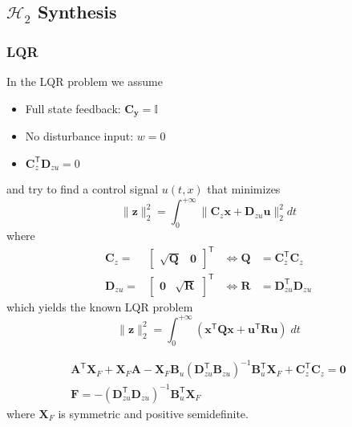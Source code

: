 \subsection{\texorpdfstring{$\mathcal{H}_2$}{H2} Synthesis}
\subsubsection{LQR}
In the LQR problem we assume
\begin{itemize}
    \item Full state feedback: $\mathbf{C_y}=\mathbf{\mathbb{I}}$
    \item No disturbance input: $w=0$
    \item $\mathbf{C}_z^{\mathsf{T}}\mathbf{D}_{zu}=0$
\end{itemize}
and try to find a control signal $u(t,x)$ that minimizes
\begin{equation*}
    \|\mathbf{z}\|_2^2=\int_0^{+\infty}\|\mathbf{C}_z \mathbf{x}+\mathbf{D}_{zu}\mathbf{u}\|_2^2 dt
\end{equation*}
where
\begin{align*}
    \mathbf{C}_z=                               &
    \begin{bmatrix}
        \sqrt{\mathbf{Q}} & \mathbf{0}
    \end{bmatrix}^{\mathsf{T}} & \Leftrightarrow \mathbf{Q} & = \mathbf{C}_z^{\mathsf{T}}\mathbf{C}_z       \\
    \mathbf{D}_{zu}=                            &
    \begin{bmatrix}
        \mathbf{0} & \sqrt{\mathbf{R}}
    \end{bmatrix}^{\mathsf{T}} & \Leftrightarrow \mathbf{R} & = \mathbf{D}_{zu}^{\mathsf{T}}\mathbf{D}_{zu}
\end{align*}
which yields the known LQR problem
\begin{equation*}
    \|\mathbf{z}\|_2^2=\int_0^{+\infty}(\mathbf{x}^{\mathsf{T}}\mathbf{Q}\mathbf{x}+\mathbf{u}^{\mathsf{T}}\mathbf{R}\mathbf{u})\;dt
\end{equation*}

\noindent\begin{gather*}
    \mathbf{A}^{\mathsf{T}}\mathbf{X}_F + \mathbf{X}_F \mathbf{A} - \mathbf{X}_F \mathbf{B}_u{\left(\mathbf{D}_{zu}^{\mathsf{T}}\mathbf{B}_{zu}\right)}^{-1} \mathbf{B}_u^{\mathsf{T}} \mathbf{X}_F + \mathbf{C}_z^{\mathsf{T}}\mathbf{C}_z = \mathbf{0}\\
    \mathbf{F} = -{\left(\mathbf{D}_{zu}^{\mathsf{T}}\mathbf{D}_{zu}\right)}^{-1} \mathbf{B}_u^{\mathsf{T}}\mathbf{X}_F
\end{gather*}
where $\mathbf{X}_F$ is symmetric and positive semidefinite.

